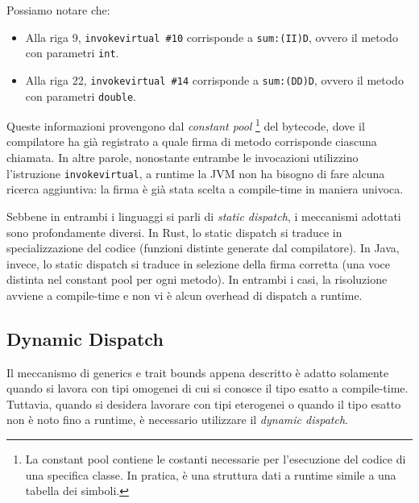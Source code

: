 Possiamo notare che:
\begin{itemize}
    \item Alla riga 9, \texttt{invokevirtual \#10} corrisponde a \texttt{sum:(II)D}, ovvero il metodo con parametri \texttt{int}.
    \item Alla riga 22, \texttt{invokevirtual \#14} corrisponde a \texttt{sum:(DD)D}, ovvero il metodo con parametri \texttt{double}.
\end{itemize}

Queste informazioni provengono dal \textit{constant pool} \footnote{La constant pool contiene le costanti necessarie per l'esecuzione del codice di una specifica classe. In pratica, è una struttura dati a runtime simile a una tabella dei simboli.} del bytecode, dove il compilatore ha già registrato a quale firma di metodo corrisponde ciascuna chiamata. In altre parole, nonostante entrambe le invocazioni utilizzino l'istruzione \texttt{invokevirtual}, a runtime la JVM non ha bisogno di fare alcuna ricerca aggiuntiva: la firma è già stata scelta a compile-time in maniera univoca.

Sebbene in entrambi i linguaggi si parli di \textit{static dispatch}, i meccanismi adottati sono profondamente diversi. In Rust, lo static dispatch si traduce in specializzazione del codice (funzioni distinte generate dal compilatore). In Java, invece, lo static dispatch si traduce in selezione della firma corretta (una voce distinta nel constant pool per ogni metodo). In entrambi i casi, la risoluzione avviene a compile-time e non vi è alcun overhead di dispatch a runtime. 
\subsection{Dynamic Dispatch}
Il meccanismo di generics e trait bounds appena descritto è adatto solamente quando si lavora con tipi omogenei di cui si conosce  il tipo esatto a compile-time. Tuttavia, quando si desidera lavorare con tipi eterogenei o quando il tipo esatto non è noto fino a runtime, è necessario utilizzare il \textit{dynamic dispatch}. 

